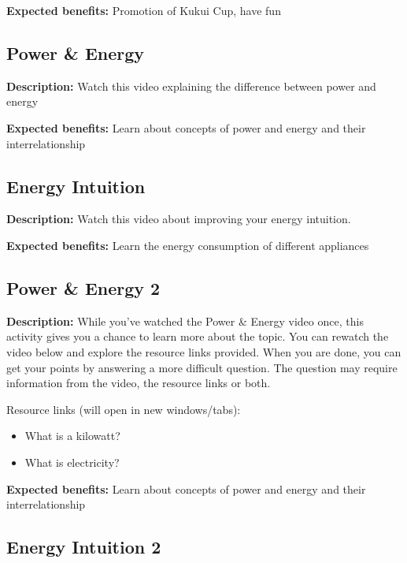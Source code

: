\vspace{2ex}
\textbf{Expected benefits:} Promotion of Kukui Cup, have fun


\subsection{Power \& Energy}

\textbf{Description:} Watch this video explaining the difference between power and energy

\vspace{2ex}
\textbf{Expected benefits:} Learn about concepts of power and energy and their interrelationship


\subsection{Energy Intuition}

\textbf{Description:} Watch this video about improving your energy intuition.

\vspace{2ex}
\textbf{Expected benefits:} Learn the energy consumption of different appliances


\subsection{Power \& Energy 2}

\textbf{Description:} While you've watched the Power \& Energy video once, this activity gives you a chance to learn more about the topic. You can rewatch the video below and explore the resource links provided. When you are done, you can get your points by answering a more difficult question. The question may require information from the video, the resource links or both.

Resource links (will open in new windows/tabs):

\begin{itemize}
	\item What is a kilowatt?
	\item What is electricity?
\end{itemize}

\vspace{2ex}
\textbf{Expected benefits:} Learn about concepts of power and energy and their interrelationship


\subsection{Energy Intuition 2}

